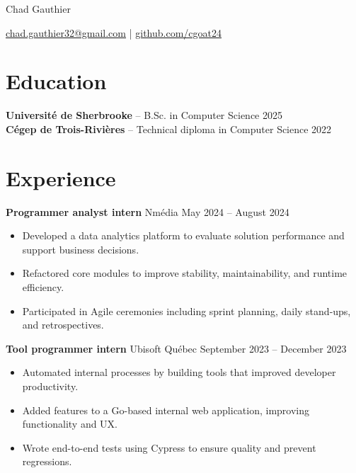 \documentclass[11pt]{article}       %
\begin{document}
\centerline{\Huge Chad Gauthier}


\centerline{\href{mailto:chad.gauthier32@gmail.com}{chad.gauthier32@gmail.com} | \href{https://www.github.com/cgoat24}{github.com/cgoat24}}

\vspace{-18.5pt}

\section*{Education}
\textbf{Université de Sherbrooke} -- B.Sc. in Computer Science \hfill 2025 \\
\textbf{Cégep de Trois-Rivières} -- Technical diploma in Computer Science \hfill 2022

\vspace{-6.5pt}

\section*{Experience}
\textbf{Programmer analyst intern} {Nmédia} \hfill May 2024 -- August 2024 \\
\vspace{-9pt}
\begin{itemize}
  \item Developed a data analytics platform to evaluate solution performance and support business decisions.
  \item Refactored core modules to improve stability, maintainability, and runtime efficiency.
  \item Participated in Agile ceremonies including sprint planning, daily stand-ups, and retrospectives.
\end{itemize}

\textbf{Tool programmer intern} {Ubisoft Québec} \hfill September 2023 -- December 2023 \\
\vspace{-9pt}
\begin{itemize}
  \item Automated internal processes by building tools that improved developer productivity.
  \item Added features to a Go-based internal web application, improving functionality and UX.
  \item Wrote end-to-end tests using Cypress to ensure quality and prevent regressions.
\end{itemize}
\end{document}
